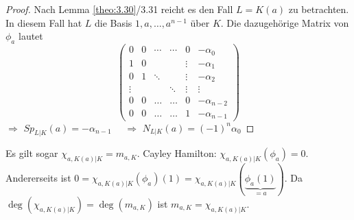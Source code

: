 \documentclass[../main.tex]{subfiles}
\begin{document}
\begin{proof}
    Nach Lemma \ref{theo:3.30}/3.31 reicht es den Fall $L=K(a)$ zu betrachten.
    In diesem Fall hat $L$ die Basis $1,a,\dots,a^{n-1}$ über $K$.
    Die dazugehörige Matrix von $\phi_a$ lautet
    $$\begin{pmatrix}
        0& 0 &\cdots &\cdots & 0 & -\alpha_0\\
        1& 0 & &  & \vdots& -\alpha_1\\
        0& 1 & \ddots && \vdots&-\alpha_2\\
        \vdots&&  &\ddots&\vdots&\vdots\\
        0&0& \dots& \dots &0& -\alpha_{n-2}\\
        0&0&\dots & \dots& 1   &    -\alpha_{n-1}
    \end{pmatrix}$$
    $\Rightarrow$ $Sp_{L|K}(a) = -\alpha_{n-1}\quad$%
    $\Rightarrow$ $N_{L|K} (a) = (-1)^n \alpha_0$
\end{proof}
\begin{remark}
    Es gilt sogar $\chi_{a,K(a)|K} = m_{a,K}$.
    Cayley Hamilton:
    $\chi_{a,K(a)|K}(\phi_a) = 0$.
    Andererseits ist $0=\chi_{a,K(a)|K}(\phi_a)(1) = \chi_{a,K(a)|K}(\underbrace{\phi_a(1)}_{=a}) $. Da $\deg(\chi_{a,K(a)|K})=\deg(m_{a,K})$ ist $m_{a,K} = \chi_{a,K(a)|K}$.
\end{remark}
\end{document}
